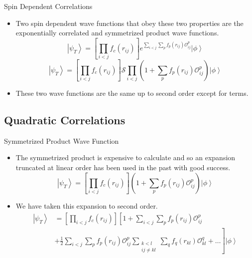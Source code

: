 \documentclass{beamer}
\newcommand{\ket}[1]{\left| #1 \right>}
\newcommand{\fpij}{f_p(r_{ij})}
\newcommand{\Opij}{\mathcal{O}_{ij}^p}
\newcommand{\fOpij}{\sum\limits_{i<j}\sum\limits_p \fpij\Opij}
\newcommand{\fqkl}{f_q(r_{kl})}
\newcommand{\Oqkl}{\mathcal{O}_{kl}^q}
\newcommand{\fOqklquad}{\sum_{\substack{k<l\\ij \ne kl}}\sum\limits_q \fqkl\Oqkl}
\begin{document}
\begin{frame}{Spin Dependent Correlations}
\begin{itemize}
   \item Two spin dependent wave functions that obey these two properties are the exponentially correlated and symmetrized product wave functions.
   \begin{equation*}
      \ket{\psi_T} = \left[\prod\limits_{i<j}f_c(r_{ij})\right] e^{\sum\limits_{i<j}\sum\limits_p\fpij\Opij} \ket{\phi}
   \end{equation*}
   \begin{equation*}
      \ket{\psi_T} = \left[\prod\limits_{i<j}f_c(r_{ij})\right] \mathcal{S}\prod\limits_{i<j}\left(1+\sum\limits_p\fpij\Opij\right) \ket{\phi}
   \end{equation*}
   \item These two wave functions are the same up to second order except for  terms.
\end{itemize}
\end{frame}

\subsection{Quadratic Correlations}
\begin{frame}{Symmetrized Product Wave Function}
\begin{itemize}
   \item The symmetrized product is expensive to calculate and so an expansion truncated at linear order has been used in the past with good success.
   \begin{equation*}
      \ket{\psi_T} = \left[\prod\limits_{i<j}f_c(r_{ij})\right] \left(1+\sum\limits_p\fpij\Opij\right) \ket{\phi}
   \end{equation*}
   \item We have taken this expansion to second order.
   \begin{equation*}
   \begin{split}
      \ket{\psi_T} &= \left[\prod\limits_{i<j}f_c(r_{ij})\right] \left[1+\fOpij\right. \\
      & + \left.\frac{1}{2}\fOpij\fOqklquad + \ldots \right] \ket{\phi}
   \end{split}
   \end{equation*}
\end{itemize}
\end{frame}
\end{document}
